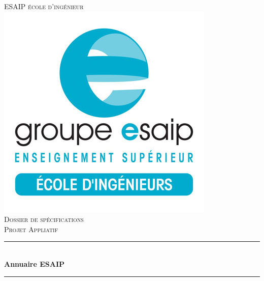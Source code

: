 \documentclass[11pt,a4paper]{report}
\begin{document}
\begin{titlepage}

\newcommand{\HRule}{\rule{\linewidth}{0.5mm}} %

\center %
 

\textsc{\LARGE ESAIP école d'ingénieur}\\[1.5cm] %
\includegraphics[scale=0.5]{logo_esaip}\\[1cm] %
\textsc{\Large Dossier de spécifications}\\[0.5cm] %
\textsc{\large Projet Appliatif}\\[0.5cm] %


\HRule \\[0.4cm]
{ \huge \bfseries Annuaire ESAIP}\\[0.4cm] %
\HRule \\[1.5cm]
 

\end{titlepage}
\end{document}
